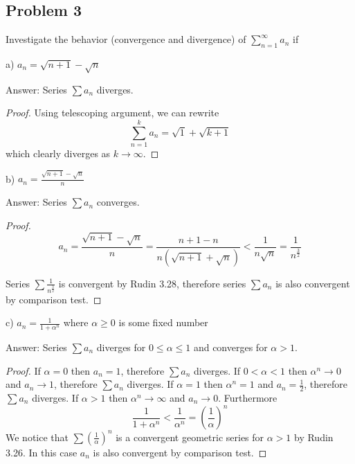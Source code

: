 \documentclass{article}
\theoremstyle{remark}
\begin{document}
\subsection*{Problem 3}

\begin{tcolorbox}
Investigate the behavior (convergence and divergence) of $\sum_{n=1}^\infty a_n$ if

a) $ a_n = \sqrt{n+1} - \sqrt{n}$
\end{tcolorbox}

Answer: Series $\sum a_n$ diverges.

\begin{proof}

Using telescoping argument, we can rewrite 
\[ \sum_{n=1}^k a_n = \sqrt{1} + \sqrt{k+1} \]
which clearly diverges as $k \to \infty$.

\end{proof}

\begin{tcolorbox}
b) $ a_n = \frac{\sqrt{n+1} - \sqrt{n}}{n}$
\end{tcolorbox}

Answer: Series $\sum a_n$ converges.

\begin{proof}

\[ a_n = \frac{\sqrt{n+1} - \sqrt{n}}{n} = \frac{n+1-n}{n(\sqrt{n+1}+\sqrt{n})} < 
\frac{1}{n \sqrt{n}} = \frac{1}{n^{\frac{3}{2}}} \]

Series $\sum \frac{1}{n^{\frac{3}{2}}} $ is convergent by Rudin 3.28, therefore series $\sum a_n$ is also convergent by comparison test.

\end{proof}

\begin{tcolorbox}
c) $a_n = \frac{1}{1+\alpha^n}$ where $\alpha \geq 0$ is some fixed number
\end{tcolorbox}

Answer: Series $\sum a_n$ diverges for $0 \leq \alpha \leq 1$ and converges for $\alpha > 1$.

\begin{proof}

If $\alpha = 0$ then $a_n = 1$, therefore $\sum a_n$ diverges.
If $0 < \alpha < 1$ then $\alpha^n \to 0$ and $a_n \to 1$, therefore $\sum a_n$ diverges.
If $\alpha = 1$ then $\alpha^n = 1$ and $a_n = \frac{1}{2}$, therefore $\sum a_n$ diverges.
If $\alpha > 1$ then $\alpha^n \to \infty$ and $a_n \to 0$.
Furthermore
\[ \frac{1}{1+\alpha^n} < \frac{1}{\alpha^n} = \left( \frac{1}{\alpha} \right)^n \]
We notice that $\sum (\frac{1}{\alpha})^n$ is a convergent geometric series for $\alpha>1$ by Rudin 3.26.
In this case $a_n$ is also convergent by comparison test.

\end{proof}
\end{document}

